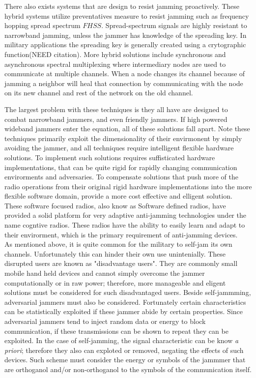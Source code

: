 \documentclass[11pt]{mvlthesis}
\begin{document}
There also exists systems that are design to resist jamming proactively.  These hybrid systems\cite{7} utilize preventatives measure to resist jamming such as frequency hopping spread spectrum \(FHSS\).  Spread-spectrum signals are highly resistant to narrowband jamming, unless the jammer has knowledge of the spreading key. In military applications the spreading key is generally created using a crytographic function(NEED citation).  More hybrid solutions include synchronous and asynchronous spectral multiplexing where intermediary nodes are used to communicate at multiple channels.  When a node changes its channel because of jamming a neighbor will heal that connection by communicating  with the node on its new channel and rest of the network on the old channel\cite{8}.


The largest problem with these techniques is they all have are designed to combat narrowband jammers, and even friendly jammers.  If high powered wideband jammers enter the equation, all of these solutions fall apart.  Note these techniques primarily exploit the dimensionality of their envirmonent by simply avoiding the jammer, and all techniques require intelligent flexible hardware solutions.   To implement such solutions requires suffisticated hardware implementations, that can be quite rigid for rapidly changing communication envirorments and adversaries.  To compensate solutions that push more of the radio operations from their original rigid hardware implementations into the more flexible software domain, provide a more cost effective and elligent solution.  These software focused radios, also know as Software defined radios, have provided a solid platform for very adaptive anti-jamming technologies under the name cogntive radios.  These radios have the ability to easily learn and adapt to their envirorment, which is the primary requirement of anti-jamming devices.\\

As mentioned above, it is quite common for the military to self-jam its own channels.  Unfortunately this can hinder their own use unintenially.  These disrupted users are known as "disadvantage users".  They are commonly small mobile hand held devices and cannot simply overcome the jammer computationally or in raw power; therefore, more manageable and eligent solutions must be considered for such disadvantaged users.  Beside self-jammming, adversarial jammers must also be considered.  Fortunately certain characteristics can be statistically exploited if these jammer abide by certain properties. Since adversarial jammers tend to inject random data or energy to block communication, if these transmissions can be shown to repeat they can be exploited.  In the case of self-jamming, the signal characteristic can be know \textit{a priori}; therefore they also can exploted or removed, negating the effects of such devices.  Such scheme must consider the energy or symbols of the jammmer that are orthoganol and/or non-orthoganol to the symbols of the communication itself.\\
\end{document}
